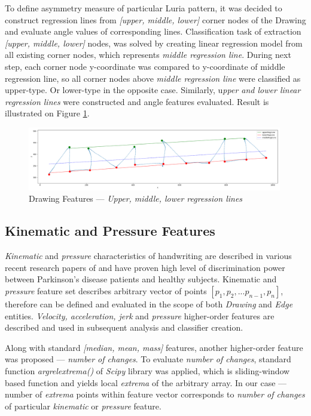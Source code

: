 To define asymmetry measure of particular Luria pattern, it was decided to construct regression lines from \textit{[upper, middle, lower]} corner nodes of the Drawing and evaluate angle values of corresponding lines. Classification task of extraction \textit{[upper, middle, lower]} nodes, was solved by creating linear regression model from all existing corner nodes, which represents \textit{middle regression line}. During next step, each corner node y-coordinate was compared to y-coordinate of middle regression line, so all corner nodes above \textit{middle regression line} were classified as upper-type. Or lower-type in the opposite case. Similarly, u\textit{pper and lower linear regression lines} were constructed and angle features evaluated. Result is illustrated on Figure \ref{regression-lines}.

\begin{figure}[htb]
  \centering
    \includegraphics[width=0.99\textwidth]
        {images/features/angle-features}
    \caption{Drawing Features --- \textit{Upper, middle, lower regression lines}}
    \label{regression-lines}
\end{figure}


\subsection{Kinematic and Pressure Features}

\textit{Kinematic} and \textit{pressure} characteristics of handwriting are described in various recent research papers of \citet{zham2017distinguishing, san2016digitized, nomm2016quantitative} and have proven high level of discrimination power between Parkinson's disease patients and healthy subjects. {Kinematic} and \textit{pressure} feature set describes arbitrary vector of points $[p_1, p_{2}, ... p_{n-1}, p_n]$, therefore can be defined and evaluated in the scope of both \textit{Drawing} and \textit{Edge} entities. \textit{Velocity, acceleration, jerk} and \textit{pressure} higher-order features are described and used in subsequent analysis and classifier creation.

Along with standard \textit{[median, mean, mass]} features, another higher-order feature was proposed --- \textit{number of changes}. To evaluate \textit{number of changes}, standard function \textit{argrelextrema()} of \textit{Scipy} library was applied, which is sliding-window based function and yields local \textit{extrema} of the arbitrary array. In our case --- number of \textit{extrema} points within feature vector corresponds to \textit{number of changes} of particular \textit{kinematic} or \textit{pressure} feature.

